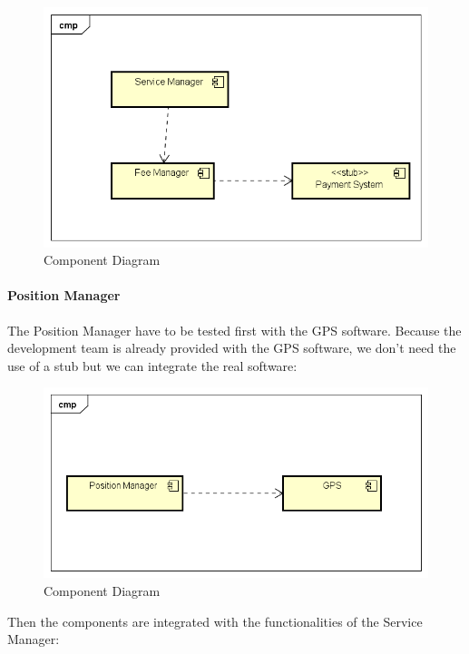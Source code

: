 \begin{figure}[H]	
	\centering
	\includegraphics[width=\textwidth]{img/FeeMan_SrvMan_int}
	\caption{Component Diagram}
\end{figure}
\paragraph{Position Manager}
The Position Manager have to be tested first with the GPS software. Because the development team is already provided with the GPS software, we don't need the use of a stub but we can integrate the real software:

\begin{figure}[H]	
	\centering
	\includegraphics[width=\textwidth]{img/PosMan_GPS_int}
	\caption{Component Diagram}
\end{figure}
Then the components are integrated with the functionalities of the Service Manager:

